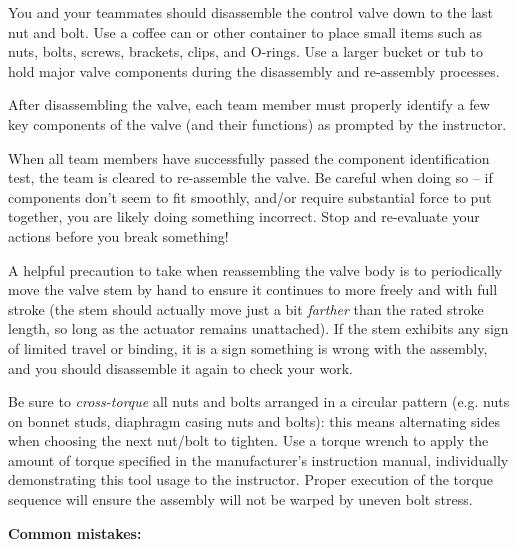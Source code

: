 You and your teammates should disassemble the control valve down to the last nut and bolt.  Use a coffee can or other container to place small items such as nuts, bolts, screws, brackets, clips, and O-rings.  Use a larger bucket or tub to hold major valve components during the disassembly and re-assembly processes.

\vskip 10pt

After disassembling the valve, each team member must properly identify a few key components of the valve (and their functions) as prompted by the instructor.

\vskip 10pt

When all team members have successfully passed the component identification test, the team is cleared to re-assemble the valve.  Be careful when doing so -- if components don't seem to fit smoothly, and/or require substantial force to put together, you are likely doing something incorrect.  Stop and re-evaluate your actions before you break something!

A helpful precaution to take when reassembling the valve body is to periodically move the valve stem by hand to ensure it continues to more freely and with full stroke (the stem should actually move just a bit {\it farther} than the rated stroke length, so long as the actuator remains unattached).  If the stem exhibits any sign of limited travel or binding, it is a sign something is wrong with the assembly, and you should disassemble it again to check your work.

Be sure to {\it cross-torque} all nuts and bolts arranged in a circular pattern (e.g. nuts on bonnet studs, diaphragm casing nuts and bolts): this means alternating sides when choosing the next nut/bolt to tighten.  Use a torque wrench to apply the amount of torque specified in the manufacturer's instruction manual, individually demonstrating this tool usage to the instructor.  Proper execution of the torque sequence will ensure the assembly will not be warped by uneven bolt stress.

\vskip 10pt

{\bf Common mistakes:}

